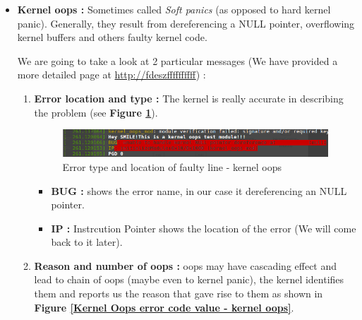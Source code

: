 \begin{itemize}
	\item \textbf{Kernel oops : } Sometimes called \emph{Soft panics} (as opposed to hard kernel panic). Generally, they result from dereferencing a NULL pointer, overflowing kernel buffers and others faulty kernel code.\\
\vspace{5px}	

\begin{center}
\end{center}	
\vspace{6px}	
We are going to take a look at 2 particular messages (We have provided a more detailed page at {\color{blue}\url{http://fdeszffffffffff}}) : 	

	\begin{enumerate}
		\item \textbf{Error location and type : } The kernel is really accurate in describing the problem (see \textbf{Figure \ref{Error type and location of faulty line - kernel oops}}).
		
\begin{figure}[H]
		\centering
        \includegraphics[scale=0.35]{img/solution/oops-error-kernel.png}
        \caption{Error type and location of faulty line - kernel oops}
        \label{Error type and location of faulty line - kernel oops}
    \end{figure}		
		
		
			\begin{itemize}
				\item \textbf{BUG : } shows the error name, in our case it \og dereferencing an NULL pointer\fg.				
				\item \textbf{IP : } Instrcution Pointer shows the location of the error (We will come back to it later).
			\end{itemize}					
		\item \textbf{Reason and number of oops : } oops may have cascading effect and lead to chain of oops (maybe even to kernel panic), the kernel identifies them and reports us the reason that gave rise to them as shown in \textbf{Figure \ref{Kernel Oops error code value - kernel oops}}.


\end{enumerate}
\end{itemize}
